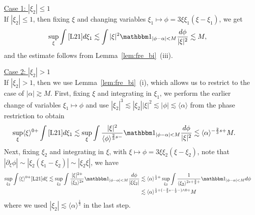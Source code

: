 \documentclass[%
11pt,  reqno]{amsart}
\newcommand{\5}{\textup{V}}
\newcommand{\noi}{\noindent}
\newcommand{\ind}{\mathbbm 1}
\newcommand{\les}{\lesssim}
\theoremstyle{remark}
\newcommand{\al}{\alpha}
\newcommand{\ges}{\gtrsim}
\newcommand{\jb}[1]
{\langle #1 \rangle}
\numberwithin{equation}{section}
\numberwithin{theorem}{section}
\begin{document}
\smallskip

\noi\underline{Case 1: $|\xi_2| \le 1$}\\
If $|\xi_2| \le 1$, then fixing $\xi$ and changing variables $\xi_1 \mapsto \phi = 3 \xi\xi_1(\xi-\xi_1)$, we get
\begin{align}
    \sup_\xi \int \eqref{L21} d\xi_1
    \les \int |\xi|^2 \ind_{|\phi - \al| < M } \frac{d\phi}{|\xi|^2 } \les M , 
\end{align}
and the estimate follows from Lemma~\ref{lem:fre_bi}~(iii).

\smallskip 

\noi\underline{Case 2: $|\xi_2| > 1$}\\
If $|\xi_2| >1$, then we use Lemma~\ref{lem:fre_bi}~(i), which allows us to restrict to the case of $|\al| \ges M$. 
First, fixing $\xi$ and integrating in $\xi_1$, we perform the earlier change of variables $\xi_1 \mapsto \phi$ and use $|\xi_2|^3 \les |\xi_2| |\xi|^2 \les |\phi| \les \jb{\al}$ from the phase restriction to obtain
\begin{align}
    \sup_{\xi} \jb{\xi}^{0+}\int \eqref{L21} d\xi_1
    &
    \les 
    \sup_\xi 
    \int \frac{|\xi|^{2}}{\jb{\phi}^{\frac23s-}} \ind_{|\phi-\al| < M} \frac{d\phi}{|\xi|^2} 
    \les \jb{\al}^{-\frac23 s+} M . 
\end{align}
Next, fixing $\xi_2$ and integrating in $\xi$, with $\xi \mapsto \phi = 3\xi \xi_2 (\xi-\xi_2)$, note that $|\partial_\xi \phi| \sim |\xi_2 (\xi_1-\xi_2)| \sim |\xi_2 \xi|$, we have
\begin{align}
\sup_{\xi_2} \int \jb{\xi}^{0+} \eqref{L21} d\xi 
\les \sup_{\xi_2} \int \frac{|\xi|^{2+}}{\jb{\xi_2}^{2s}} \ind_{|\phi-\al| < M} \frac{d\phi}{|\xi\xi_2|} 
&
\les 
\jb{\al}^{\frac12+}
\sup_{\xi_2} \int \frac{1}{\jb{\xi_2}^{2s+\frac32+}} \ind_{|\phi-\al| < M } d\phi
\\
&
\les
\jb{\al}^{\frac12 + (-\frac23 s - \frac12 -) \land 0 
+ } M
\end{align}
where we used $|\xi_2| \les \jb{\al}^{\frac13}$ in the last step. 
\end{document}
